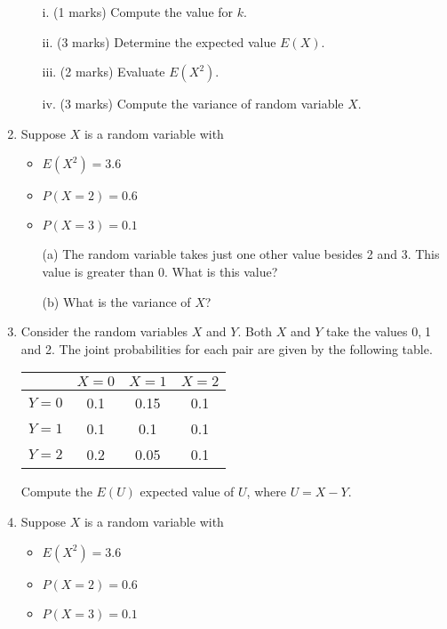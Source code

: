 \documentclass[]{report}
\begin{document}
\begin{enumerate}
	\begin{itemize}
		\item[i.] (1 marks) Compute the value for $k$.
		\item[ii.] (3 marks) Determine the expected value $E(X)$.
		\item[iii.] (2 marks) Evaluate $E(X^2)$.
		\item[iv.] (3 marks) Compute the variance of random variable $X$.
	\end{itemize}
	\item 
	Suppose $X$ is a random variable with 
	\begin{itemize}
		\item $E(X^2)=3.6$
		\item $P(X=2)=0.6$
		\item $P(X=3)=0.1$
	\end{itemize}
	
	\begin{itemize}
		\item[(a)] The random variable takes just one other value besides 2 and 3. This value is greater than 0. What is this value?
		\item[(b)] What is the variance of $X$?
	\end{itemize}
	

	
	\item Consider the random variables $X$ and $Y$. Both $X$ and $Y$ take the values 0,$\;$1 and 2. 
	The joint probabilities for each pair are given by the following table.
	\begin{center}
		\begin{tabular}{|c|c|c|c|}
			\hline  & $X=0$ & $X=1$ & $X=2$ \\ 
			\hline $Y=0$ & 0.1 & 0.15 & 0.1 \\ 
			\hline $Y=1$ & 0.1 & 0.1 & 0.1 \\ 
			\hline $Y=2$ & 0.2 & 0.05 & 0.1 \\ 
			\hline 
		\end{tabular} 
	\end{center}
	Compute the $E(U)$ expected value of $U$, where $U=X-Y$.

\item 
	Suppose $X$ is a random variable with 
	\begin{itemize}
		\item $E(X^2)=3.6$
		\item $P(X=2)=0.6$
		\item $P(X=3)=0.1$
	\end{itemize}
	

\end{enumerate}
\end{document}
